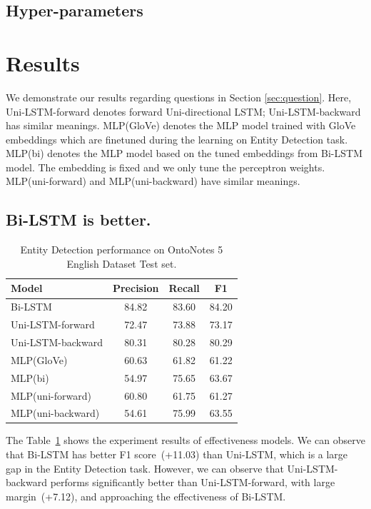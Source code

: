 \documentclass{article}
\begin{document}
\subsection{Hyper-parameters}


\section{Results}

We demonstrate our results regarding questions in Section \ref{sec:question}. Here, Uni-LSTM-forward denotes forward Uni-directional LSTM; Uni-LSTM-backward has similar meanings. MLP(GloVe) denotes the MLP model trained with GloVe embeddings which are finetuned during the learning on Entity Detection task. MLP(bi) denotes the MLP model based on the tuned embeddings from Bi-LSTM model. The embedding is fixed and we only tune the perceptron weights. MLP(uni-forward) and MLP(uni-backward) have similar meanings.

\subsection{Bi-LSTM is better.}

\begin{table}[t]
	\centering
	\begin{tabular}{l@{\qquad}ccc}
		\toprule
		\textbf{Model}         & \textbf{Precision} & \textbf{Recall} & \textbf{F1} \\ \midrule
		Bi-LSTM &  84.82 & 83.60  & 84.20 \\
		Uni-LSTM-forward & 72.47 & 73.88 & 73.17 \\
		Uni-LSTM-backward & 80.31 & 80.28 & 80.29 \\ \midrule
		MLP(GloVe) & 60.63 & 61.82 & 61.22 \\
		MLP(bi) & 54.97 & 75.65 & 63.67 \\ 
		MLP(uni-forward) & 60.80 & 61.75 &  61.27 \\ 
		MLP(uni-backward) & 54.61 & 75.99 & 63.55 \\ 
		\bottomrule
	\end{tabular}
	\vspace{3mm}
	\caption{Entity Detection performance on OntoNotes 5 English Dataset Test set. }
	\label{res:ner}
\end{table}

The Table~\ref{res:ner} shows the experiment results of effectiveness models. 
We can observe that Bi-LSTM has better F1 score~(+11.03) than Uni-LSTM, which is a large gap in the Entity Detection task. However, we can observe that Uni-LSTM-backward performs significantly better than Uni-LSTM-forward, with large margin~(+7.12), and approaching the effectiveness of Bi-LSTM.
\end{document}
